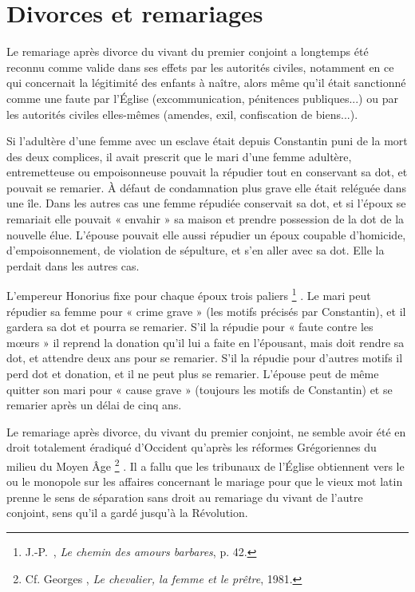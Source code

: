 \section{Divorces et remariages}

 Le remariage après divorce du vivant du premier conjoint a longtemps été reconnu comme valide dans ses effets par les autorités civiles, notamment en ce qui concernait la légitimité des enfants à naître, alors même qu'il était sanctionné comme une faute par l'Église (excommunication, pénitences publiques...) ou par les autorités civiles elles-mêmes (amendes, exil, confiscation de biens...). 

 Si l'adultère d'une femme avec un esclave était depuis Constantin puni de la mort des deux complices, il avait prescrit que le mari d'une femme adultère, entremetteuse ou empoisonneuse pouvait la répudier tout en conservant sa dot, et pouvait se remarier. À défaut de condamnation plus grave elle était reléguée dans une île. Dans les autres cas une femme répudiée conservait sa dot, et si l'époux se remariait elle pouvait « envahir » sa maison et prendre possession de la dot de la nouvelle élue. L'épouse pouvait elle aussi répudier un époux coupable d'homicide, d'empoisonnement, de violation de sépulture, et s'en aller avec sa dot. Elle la perdait dans les autres cas. 

 L'empereur Honorius fixe pour chaque époux trois paliers%
\footnote{J.-P.~, \emph{Le chemin des amours barbares}, p. 42.}%
. Le mari peut répudier sa femme pour « crime grave » (les motifs précisés par Constantin), et il gardera sa dot et pourra se remarier. S'il la répudie pour « faute contre les mœurs » il reprend la donation qu'il lui a faite en l'épousant, mais doit rendre sa dot, et attendre deux ans pour se remarier. S'il la répudie pour d'autres motifs il perd dot et donation, et il ne peut plus se remarier. L'épouse peut de même quitter son mari pour « cause grave » (toujours les motifs de Constantin) et se remarier après un délai de cinq ans.

 Le remariage après divorce, du vivant du premier conjoint, ne semble avoir été en droit totalement éradiqué d'Occident qu'après les réformes Grégoriennes du milieu du Moyen Âge%
\footnote{Cf. Georges , \emph{Le chevalier, la femme et le prêtre}, 1981.}%
. Il a fallu que les tribunaux de l'Église obtiennent vers le \ieme{} ou  le monopole sur les affaires concernant le mariage pour que le vieux mot latin  prenne le sens de séparation sans droit au remariage du vivant de l'autre conjoint, sens qu'il a gardé jusqu'à la Révolution. 


